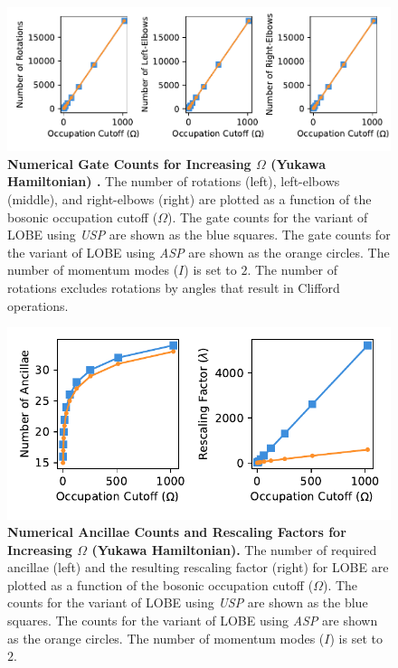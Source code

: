 \begin{figure}
    \centering
    \includegraphics[width=16cm]{figures/Yukawa_hamiltonian_gates_vs_omega.pdf}
    \caption{
        \textbf{Numerical Gate Counts for Increasing $\Omega$ (Yukawa Hamiltonian) .}
        The number of rotations (left), left-elbows (middle), and right-elbows (right) are plotted as a function of the bosonic occupation cutoff ($\Omega$).
        The gate counts for the variant of LOBE using \textit{USP} are shown as the blue squares.
        The gate counts for the variant of LOBE using \textit{ASP} are shown as the orange circles.
        The number of momentum modes ($I$) is set to $2$.
        The number of rotations excludes rotations by angles that result in Clifford operations.
    }
    \label{fig:Yukawa_hamiltonian_gates_vs_omega}
\end{figure}
\begin{figure}
    \centering
    \includegraphics[width=12cm]{figures/Yukawa_hamiltonian_qubits_and_rescaling_vs_omega.pdf}
    \caption{
        \textbf{Numerical Ancillae Counts and Rescaling Factors for Increasing $\Omega$ (Yukawa Hamiltonian).}
        The number of required ancillae (left) and the resulting rescaling factor (right) for LOBE are plotted as a function of the bosonic occupation cutoff ($\Omega$).
        The counts for the variant of LOBE using \textit{USP} are shown as the blue squares.
        The counts for the variant of LOBE using \textit{ASP} are shown as the orange circles.
        The number of momentum modes ($I$) is set to $2$.
    }
    \label{fig:Yukawa_hamiltonian_qubits_and_rescaling_vs_omega}
\end{figure}

